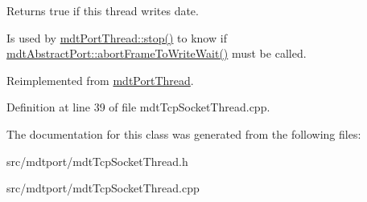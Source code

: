 Returns true if this thread writes date. 

Is used by \hyperlink{classmdt_port_thread_a5746ea96689ed80179751ad1353f0b39}{mdtPortThread::stop()} to know if \hyperlink{classmdt_abstract_port_ae67c815f68317c70e398eaa86622af6b}{mdtAbstractPort::abortFrameToWriteWait()} must be called. 

Reimplemented from \hyperlink{classmdt_port_thread_a0122a12262052cf3643241a3eaa31c58}{mdtPortThread}.



Definition at line 39 of file mdtTcpSocketThread.cpp.



The documentation for this class was generated from the following files:\begin{DoxyCompactItemize}
\item 
src/mdtport/mdtTcpSocketThread.h\item 
src/mdtport/mdtTcpSocketThread.cpp\end{DoxyCompactItemize}
